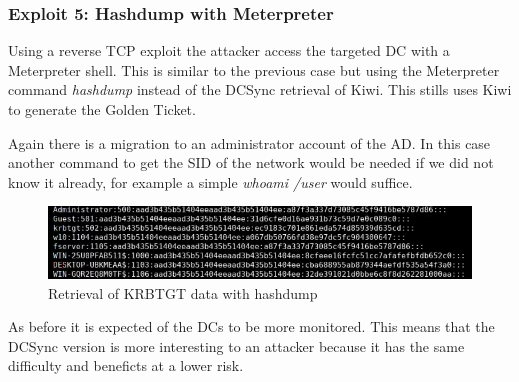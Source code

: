 \subsubsection{Exploit 5: Hashdump with Meterpreter}
Using a reverse TCP exploit the attacker access the targeted DC with a Meterpreter shell. This is similar to the previous case but using the Meterpreter command \textit{hashdump} instead of the DCSync retrieval of Kiwi\cite{pentestlab}. This stills uses Kiwi to generate the Golden Ticket.
\linej

\linej
Again there is a migration to an administrator account of the AD. In this case another command to get the SID of the network would be needed if we did not know it already, for example a simple \textit{whoami /user} would suffice.
\linej

\begin{figure}[H]
	\centering
	\includegraphics[width=\textwidth]{figuras/hashdump.png}
	\caption{Retrieval of KRBTGT data with hashdump}
\end{figure}
As before it is expected of the DCs to be more monitored. This means that the DCSync version is more interesting to an attacker because it has the same difficulty and beneficts at a lower risk.

